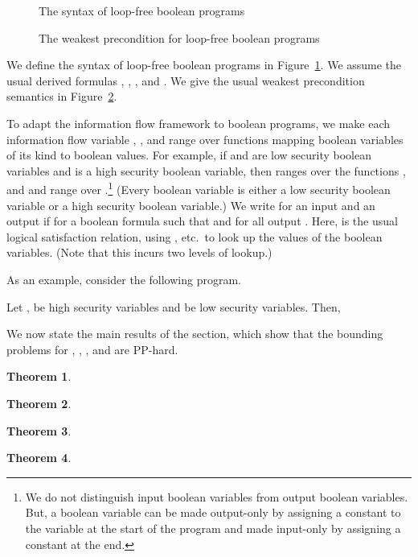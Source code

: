 \documentclass{llncs}
\newtheorem{theorem}{Theorem}[section]
\begin{document}
\begin{figure}[t]

\caption{The syntax of loop-free boolean programs}
\label{fig:syntax}
\end{figure}

\begin{figure}[t]

\caption{The weakest precondition for loop-free boolean programs}
\label{fig:wpsemantics}
\end{figure}

We define the syntax of loop-free boolean programs in
Figure~\ref{fig:syntax}.  We assume the usual derived formulas , , , and .
We give the usual weakest precondition semantics in
Figure~\ref{fig:wpsemantics}.

To adapt the information flow framework to boolean programs, we make
each information flow variable , , and  range over functions
mapping boolean variables of its kind to boolean values.  For example,
if  and  are low security boolean variables and  is a high
security boolean variable, then  ranges over the functions
, and  and
 range over .\footnote{ We do not distinguish input boolean variables
  from output boolean variables.  But, a boolean variable can be made
  output-only by assigning a constant to the variable at the start of
  the program and made input-only by assigning a constant at the end.}
(Every boolean variable is either a low security boolean variable or a
high security boolean variable.)  We write  for an
input  and an output  if  for a boolean formula  such that  and  for all output .  Here,
 is the usual logical satisfaction relation, using
, etc.~to look up the values of the boolean variables.
(Note that this incurs two levels of lookup.)

As an example, consider the following program.

Let ,  be high security variables and  be low security
variables.  Then,

We now state the main results of the section, which show that the
bounding problems for , , , and
 are PP-hard.
\begin{theorem}

\label{thm:ppse}
\end{theorem}
\begin{theorem}

\label{thm:ppme}
\end{theorem}
\begin{theorem}

\label{thm:ppge}
\end{theorem}
\begin{theorem}

\label{thm:ppcc}
\end{theorem}
\end{document}
